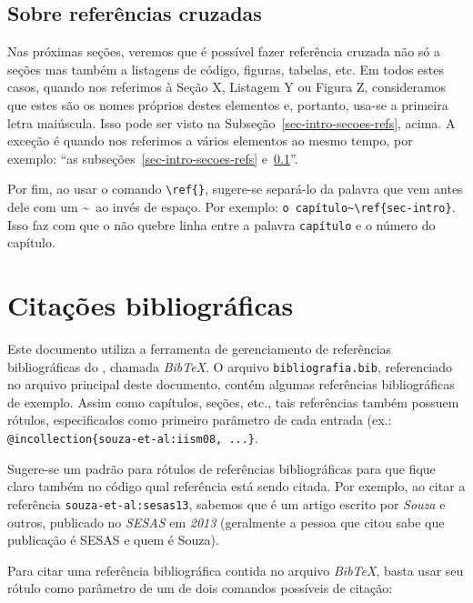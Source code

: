 \subsection{Sobre referências cruzadas}
\label{sec-intro-secoes-sobrerefs}

Nas próximas seções, veremos que é possível fazer referência cruzada não só a seções mas também a listagens de código, figuras, tabelas, etc. Em todos estes casos, quando nos referimos à Seção X, Listagem Y ou Figura Z, consideramos que estes são os nomes próprios destes elementos e, portanto, usa-se a primeira letra maiúscula. Isso pode ser visto na Subseção~\ref{sec-intro-secoes-refs}, acima. A exceção é quando nos referimos a vários elementos ao mesmo tempo, por exemplo: ``as subseções~\ref{sec-intro-secoes-refs} e~\ref{sec-intro-secoes-sobrerefs}''.

Por fim, ao usar o comando \texttt{\textbackslash ref\{\}}, sugere-se separá-lo da palavra que vem antes dele com um \textasciitilde\ ao invés de espaço. Por exemplo: \texttt{o capítulo\textasciitilde \textbackslash ref\{sec-intro\}}. Isso faz com que o \latex não quebre linha entre a palavra \texttt{capítulo} e o número do capítulo.




\section{Citações bibliográficas}
\label{sec-intro-citacoes}

Este documento utiliza a ferramenta de gerenciamento de referências bibliográficas do \latex, chamada \emph{BibTeX}. O arquivo \texttt{bibliografia.bib}, referenciado no arquivo \latex principal deste documento, contém algumas referências bibliográficas de exemplo. Assim como capítulos, seções, etc., tais referências também possuem rótulos, especificados como primeiro parâmetro de cada entrada (ex.: \texttt{@incollection\{souza-et-al:iism08, ...\}}.

Sugere-se um padrão para rótulos de referências bibliográficas para que fique claro também no código \latex qual referência está sendo citada. Por exemplo, ao citar a referência \texttt{souza-et-al:sesas13}, sabemos que é um artigo escrito por \emph{Souza} e outros, publicado no \emph{SESAS} em \emph{2013} (geralmente a pessoa que citou sabe que publicação é SESAS e quem é Souza).

Para citar uma referência bibliográfica contida no arquivo \emph{BibTeX}, basta usar seu rótulo como parâmetro de um de dois comandos possíveis de citação:

